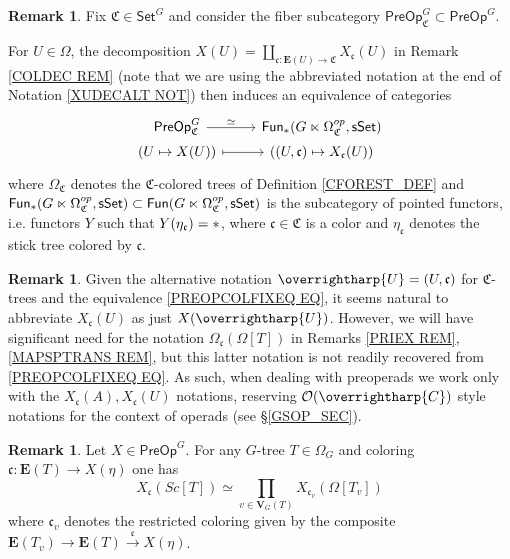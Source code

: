 \documentclass[a4paper,10pt
,draft
]{article}%
\numberwithin{equation}{section}
\numberwithin{figure}{section}
\theoremstyle{definition} %
\newtheorem{remark}[equation]{Remark}%
\newcommand{\vect}[1]{\text{\overrightharp{\ensuremath{#1}}}}
\renewcommand{\O}{\ensuremath{\mathcal O}}
\newcommand{\1}{\ensuremath{\mathbbm 1}}%
\begin{document}
\begin{remark}
	Fix $\mathfrak{C} \in \mathsf{Set}^G$
	and consider the fiber subcategory 
	$\mathsf{PreOp}^G_{\mathfrak{C}} \subset \mathsf{PreOp}^G$.
	
	For $U \in \Omega$, the decomposition
	$X(U) = \coprod_{\mathfrak{c} \colon \boldsymbol{E}(U) \to \mathfrak{C}} X_{\mathfrak{c}}(U)$
	in Remark \ref{COLDEC REM}
	(note that we are using the abbreviated notation at the end of
	Notation \ref{XUDECALT NOT})
	then induces an equivalence of categories
\begin{equation}\label{PREOPCOLFIXEQ EQ}
\begin{tikzcd}[row sep = 0]
	\mathsf{PreOp}^G_{\mathfrak{C}}
	\ar{r}{\simeq}
&
	\mathsf{Fun}_{\**}(G \ltimes \Omega^{op}_{\mathfrak{C}},\mathsf{sSet})
\\
	(U \mapsto X(U))
	\ar[mapsto]{r}
&
	((U,\mathfrak{c}) \mapsto X_{\mathfrak{c}}(U))
\end{tikzcd}
\end{equation}
	where $\Omega_{\mathfrak{C}}$
	denotes the $\mathfrak{C}$-colored trees of 
	Definition \ref{CFOREST_DEF} and 
	$\mathsf{Fun}_{\**}(G \ltimes \Omega^{op}_{\mathfrak{C}},\mathsf{sSet})
	\subset
	\mathsf{Fun}(G \ltimes \Omega^{op}_{\mathfrak{C}},\mathsf{sSet})$
	is the subcategory of pointed functors,
	i.e. functors $Y$ such that
	$Y(\eta_{\mathfrak{c}}) = \**$,
	where $\mathfrak{c} \in \mathfrak{C}$ is a color
	and $\eta_{\mathfrak{c}}$ denotes the stick tree colored by $\mathfrak{c}$.
\end{remark}


\begin{remark}
	Given the alternative notation
	$\vect{U} = (U,\mathfrak{c})$
	for $\mathfrak{C}$-trees and the equivalence
	\eqref{PREOPCOLFIXEQ EQ}, 
	it seems natural to abbreviate 
	$X_{\mathfrak{c}}(U)$ as just $X(\vect{U})$.
	However, we will have significant need for the notation
	$\Omega_{\mathfrak{c}}(\Omega[T])$
	in Remarks \ref{PRIEX REM},\ref{MAPSPTRANS REM},
	but this latter notation is not readily recovered from 
	\eqref{PREOPCOLFIXEQ EQ}.
	As such, when dealing with preoperads we work only with the 
	$X_{\mathfrak{c}}(A),X_{\mathfrak{c}}(U)$
	notations,
	reserving $\O(\vect{C})$ style notations for the context of operads (see \S \ref{GSOP_SEC}).
\end{remark}



\begin{remark}\label{SCTCOLPR REM}
	Let $X \in \mathsf{PreOp}^G$.
	For any $G$-tree $T \in \Omega_G$
	and coloring 
	$\mathfrak{c} \colon \boldsymbol{E}(T) \to X(\eta)$
	one has
	\[
	X_{\mathfrak{c}}(Sc[T]) 
	\simeq
	\prod_{v \in \boldsymbol{V}_G(T)}
	X_{\mathfrak{c}_v}(\Omega[T_v]) 
	\]
where $\mathfrak{c}_v$
denotes the restricted coloring given by the composite
$\boldsymbol{E}(T_v) \to \boldsymbol{E}(T) 
\xrightarrow{\mathfrak{c}} X(\eta)$. 
\end{remark}
\end{document}

